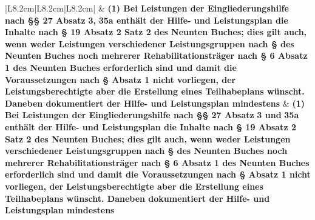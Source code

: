 \documentclass[10pt,a4paper,landscape]{article}
\begin{document}
\begin{longtable}{|L{8.2cm}|L{8.2cm}|L{8.2cm}|}
\hhline{|---|}
 & \textbf{(1) Bei Leistungen der  \newline Eingliederungshilfe nach \S{}\S{} 27 Absatz} \newline \textbf{\textcolor{diffred}{3,}}\textbf{ 35a enthält der Hilfe- und  \newline Leistungsplan die Inhalte nach \S{} 19  \newline Absatz 2 Satz 2 des Neunten Buches;  \newline dies gilt auch, wenn weder Leistungen  \newline verschiedener Leistungsgruppen nach \S{}   des Neunten Buches noch mehrerer  \newline Rehabilitationsträger nach \S{} 6 Absatz 1  \newline des Neunten Buches erforderlich sind  \newline und damit die Voraussetzungen nach \S{}   Absatz 1 nicht vorliegen, der  \newline Leistungsberechtigte aber die  \newline Erstellung eines Teilhabeplans wünscht.  \newline Daneben dokumentiert der Hilfe- und  \newline Leistungsplan mindestens } & \textbf{(1) Bei Leistungen der  \newline Eingliederungshilfe nach \S{}\S{} 27 Absatz }\textbf{\textcolor{diffgreen}{3  \newline und}}\textbf{ 35a enthält der Hilfe- und  \newline Leistungsplan die Inhalte nach \S{} 19  \newline Absatz 2 Satz 2 des Neunten Buches;  \newline dies gilt auch, wenn weder Leistungen  \newline verschiedener Leistungsgruppen nach \S{}   des Neunten Buches noch mehrerer  \newline Rehabilitationsträger nach \S{} 6 Absatz 1  \newline des Neunten Buches erforderlich sind  \newline und damit die Voraussetzungen nach \S{}   Absatz 1 nicht vorliegen, der } \textbf{Leistungsberechtigte aber die  \newline Erstellung eines Teilhabeplans wünscht.  \newline Daneben dokumentiert der Hilfe- und  \newline Leistungsplan mindestens } \\

\end{longtable}
\end{document}
